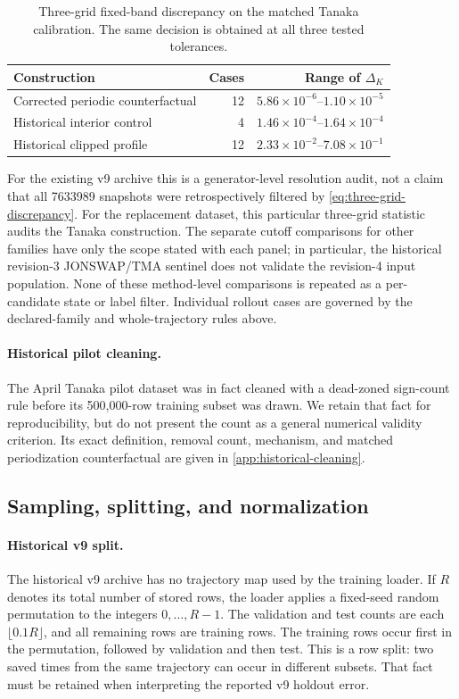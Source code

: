 \begin{table}[t]
  \centering
  \caption{Three-grid fixed-band discrepancy on the matched Tanaka
  calibration.  The same decision is obtained at all three tested tolerances.}
  \label{tab:three-grid-calibration}
  \begin{tabular}{lrr}
    \toprule
    Construction & Cases & Range of $\Delta_K$\\
    \midrule
    Corrected periodic counterfactual & 12 &
      $5.86\times10^{-6}$--$1.10\times10^{-5}$\\
    Historical interior control & 4 &
      $1.46\times10^{-4}$--$1.64\times10^{-4}$\\
    Historical clipped profile & 12 &
      $2.33\times10^{-2}$--$7.08\times10^{-1}$\\
    \bottomrule
  \end{tabular}
\end{table}

For the existing v9 archive this is a generator-level resolution audit, not a
claim that all \num{7633989} snapshots were retrospectively filtered by
\cref{eq:three-grid-discrepancy}.  For the replacement dataset, this particular
three-grid statistic audits the Tanaka construction.  The separate cutoff
comparisons for other families have only the scope stated with each panel; in
particular, the historical revision-3 JONSWAP/TMA sentinel does not validate
the revision-4 input population.  None of these method-level comparisons is
repeated as a per-candidate state or label filter.  Individual rollout cases
are governed by the declared-family and whole-trajectory rules above.

\paragraph{Historical pilot cleaning.}
The April Tanaka pilot dataset was in fact cleaned with a dead-zoned sign-count
rule before its 500,000-row training subset was drawn.  We retain that fact for
reproducibility, but do not present the count as a general numerical validity
criterion.  Its exact definition, removal count, mechanism, and matched
periodization counterfactual are given in \cref{app:historical-cleaning}.

\subsection{Sampling, splitting, and normalization}

\paragraph{Historical v9 split.}
The historical v9 archive has no trajectory map used by the training loader.
If $R$ denotes its total number of stored rows, the loader applies a
fixed-seed random permutation to the integers $0,\ldots,R-1$.  The validation
and test counts are each $\lfloor0.1R\rfloor$, and all remaining rows are
training rows.  The training rows occur first in the permutation, followed
by validation and then test.  This is a row split: two saved times from the same
trajectory can occur in different subsets.  That fact must be retained when
interpreting the reported v9 holdout error.

